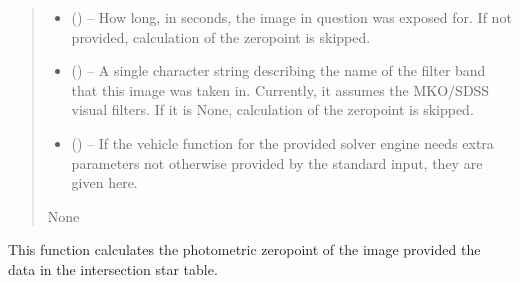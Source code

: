 \documentclass[letterpaper,11pt,english]{sphinxmanual}
\begin{document}
\begin{savenotes}
\begin{fulllineitems}
\begin{savenotes}
\begin{fulllineitems}
\begin{quote}
\begin{description}
\begin{itemize}
\item {} 
\sphinxAtStartPar
{} (\sphinxstyleliteralemphasis{\sphinxupquote{, }}) – How long, in seconds, the image in question was exposed for. If
not provided, calculation of the zero\sphinxhyphen{}point is skipped.

\item {} 
\sphinxAtStartPar
{} (\sphinxstyleliteralemphasis{\sphinxupquote{, }}) – A single character string describing the name of the filter band that
this image was taken in. Currently, it assumes the MKO/SDSS visual
filters. If it is None, calculation of the zero\sphinxhyphen{}point is skipped.

\item {} 
\sphinxAtStartPar
{} () – If the vehicle function for the provided solver engine needs
extra parameters not otherwise provided by the standard input,
they are given here.

\end{itemize}

\sphinxAtStartPar
None

\end{description}\end{quote}

\end{fulllineitems}\end{savenotes}


\begin{savenotes}\begin{fulllineitems}
\label{\detokenize{code/opihiexarata.photometry.solution:opihiexarata.photometry.solution.PhotometricSolution._calculate_zero_point}}
\pysigstartsignatures
{}
\pysigstopsignatures
\sphinxAtStartPar
This function calculates the photometric zero\sphinxhyphen{}point of the image
provided the data in the intersection star table.


\end{fulllineitems}
\end{savenotes}
\end{fulllineitems}
\end{savenotes}
\end{document}
